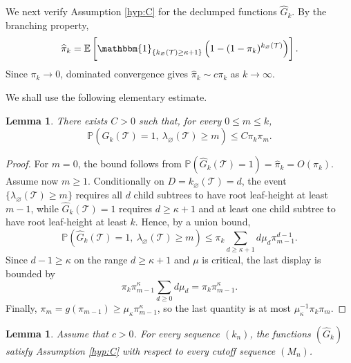 \documentclass[a4paper,11pt]{article}
\newtheorem{lemma}[theorem]{Lemma}
\newcommand{\E}{\mathbb{E}}
\DeclareRobustCommand{\P}{\mathbb{P}}
\DeclareRobustCommand{\1}{\mathbf{1}}
\begin{document}
We next verify Assumption \ref{hyp:C} for the declumped functions
$\widehat{G}_k$. By the branching property,
$$
  \widehat{\pi}_k
  =
  \E\left[
    \mathbbm{1}_{\{k_\varnothing(\mathcal T)\ge\kappa+1\}}
    \left(1-(1-\pi_k)^{k_\varnothing(\mathcal T)}\right)
  \right].
$$
Since $\pi_k\to0$, dominated convergence gives
$
  \widehat{\pi}_k\sim c\pi_k$  as  $k\to\infty$.

We shall use the following elementary estimate.

\begin{lemma}
  \label{lem:lh_conditional_mark}
  There exists $C>0$ such that, for every $0\le m\le k$,
  $$
    \P(\widehat{G}_k(\mathcal T)=1,\ \lambda_\varnothing(\mathcal T)\ge m)
    \le
    C\pi_k\pi_m.
  $$
\end{lemma}

\begin{proof}
  For $m=0$, the bound follows from
  $\P(\widehat{G}_k(\mathcal T)=1)=\widehat{\pi}_k=O(\pi_k)$. Assume now
  $m\ge1$. Conditionally on $D=k_\varnothing(\mathcal T)=d$, the event
  $\{\lambda_\varnothing(\mathcal T)\ge m\}$ requires all $d$ child subtrees
  to have root leaf-height at least $m-1$, while $\widehat{G}_k(\mathcal T)=1$
  requires $d\ge\kappa+1$ and at least one child subtree to have root
  leaf-height at least $k$. Hence, by a union bound,
  $$
    \P(\widehat{G}_k(\mathcal T)=1,\ \lambda_\varnothing(\mathcal T)\ge m)
    \le
    \pi_k
    \sum_{d\ge\kappa+1}d\mu_d\pi_{m-1}^{d-1}.
  $$
  Since $d-1\ge\kappa$ on the range $d\ge\kappa+1$ and $\mu$ is critical, the
  last display is bounded by
  $$
    \pi_k\pi_{m-1}^{\kappa}\sum_{d\ge0}d\mu_d
    =
    \pi_k\pi_{m-1}^{\kappa}.
  $$
  Finally, $\pi_m=g(\pi_{m-1})\ge\mu_\kappa\pi_{m-1}^{\kappa}$, so the last
  quantity is at most $\mu_\kappa^{-1}\pi_k\pi_m$.
\end{proof}

\begin{lemma}
\label{lem:C_lh}
Assume that $c>0$. For every sequence $(k_n)$, the functions
$(\widehat G_k)$ satisfy Assumption \ref{hyp:C} with respect to every cutoff
sequence $(M_n)$.
\end{lemma}
\end{document}
